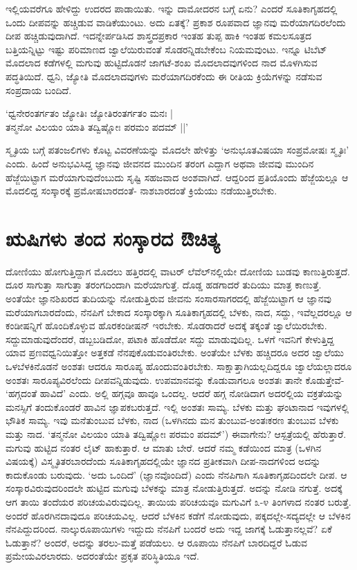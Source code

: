 ಇಲ್ಲಿಯವರೆಗೂ ಹೇಳಿದ್ದು ಉದರದ ಪಾಡಾಯಿತು. ಇನ್ನು ದಾಮೋದರನ ಬಗ್ಗೆ ಏನು? ಎಂದರೆ ಸೂತಿಕಾಗೃಹದಲ್ಲಿ ಒಂದು ದೀಪವನ್ನು ಹಚ್ಚಿಡುವ ವಾಡಿಕೆಯುಂಟು. ಅದು ಏತಕ್ಕೆ? ಪ್ರಕಾಶ ರೂಪವಾದ ಜ್ಞಾನವು ಮರೆಯಾಗದಿರಲೆಂದು ದೀಪ ಹಚ್ಚಿಡುವುದಾಗಿದೆ. ಇದನ್ನೇರ್ಪಡಿಸಿದ ಶಾಸ್ತ್ರದಪ್ರಕಾರ ಇಂತಹ ತುಪ್ಪ ಹಾಕಿ ಇಂತಹ ಕಮಲಸೂತ್ರದ ಬತ್ತಿಯನ್ನಿಟ್ಟು ಇಷ್ಟು ಪರಿಮಾಣದ ಜ್ವಾಲೆಯಿರುವಂತೆ ಸೊಡರನ್ನಿಡಬೇಕೆಂಬ ನಿಯಮವುಂಟು. ಇನ್ನೂ ಟಿಬೆಟ್ ಮೊದಲಾದ ಕಡೆಗಳಲ್ಲಿ ಮಗುವು ಹುಟ್ಟಿದೊಡನೆ ಜಾಗಟೆ-ಶಂಖ ಮೊದಲಾದವುಗಳಿಂದ ನಾದ ಮೊಳಗಿಸುವ ಪದ್ಧತಿಯಿದೆ. ಧ್ವನಿ, ಜ್ಯೋತಿ ಮೊದಲಾದವುಗಳು ಮರೆಯಾಗದಿರಕೆಂದು ಈ ರೀತಿಯ ಕ್ರಿಯೆಗಳನ್ನು ನಡೆಸುವ ಸಂಪ್ರದಾಯ ಬಂದಿದೆ.

\begin{shloka}
`ಧ್ವನೇರಂತರ್ಗತಂ ಜ್ಯೋತಿಃ ಜ್ಯೋತಿರಂತರ್ಗತಂ ಮನಃ |\\
ತನ್ಮನೋ ವಿಲಯಂ ಯಾತಿ ತದ್ವಿಷ್ಣೋಃ ಪರಮಂ ಪದಮ್ ||'
\end{shloka}

ಸ್ಮೃತಿಯ ಬಗ್ಗೆ ಪತಂಜಲಿಗಳು ಕೊಟ್ಟ ವಿವರಣೆಯನ್ನು ಮೊದಲೇ ಹೇಳಿತ್ತು `ಅನುಭೂತವಿಷಯಾ ಸಂಪ್ರಮೋಷಃ ಸ್ಮೃತಿಃ' ಎಂದು. ಹಿಂದೆ ಅನುಭವಿಸಿದ್ದ ಜ್ಞಾನವು ಜೀವನದ ಮುಂದಿನ ತರಂಗ ಎದ್ದಾಗ ಅಥವಾ ಜೀವವು ಮುಂದಿನ ಹೆಜ್ಜೆಯಿಟ್ಟಾಗ ಮರೆಯಾಗುವುದೆಂಬುದು ಸೃಷ್ಟಿ ಸಹಜವಾದ ಅಂಶವಾಗಿದೆ. ಆದ್ದರಿಂದ ಪ್ರತಿಯೊಂದು ಹೆಜ್ಜೆಯಲ್ಲೂ ಆ ಮೊದಲಿದ್ದ ಸಂಸ್ಕಾರಕ್ಕೆ  ಪ್ರಮೋಷಬಾರದಂತೆ- ನಾಶಬಾರದಂತೆ ಕ್ರಿಯೆಯು ನಡೆಯುತ್ತಿರಬೇಕು.

\section*{ಋಷಿಗಳು ತಂದ ಸಂಸ್ಕಾರದ ಔಚಿತ್ಯ}

ದೋಣಿಯು ಹೋಗುತ್ತಿದ್ದಾಗ ಮೊದಲು ಹತ್ತಿರದಲ್ಲಿ ವಾಟರ್ ಲೆವೆಲ್‌ನಲ್ಲಿಯೇ ದೋಣಿಯ ಬುಡವು ಕಾಣುತ್ತಿರುತ್ತದೆ. ದೂರ ಸಾಗುತ್ತಾ ಸಾಗುತ್ತಾ ತರಂಗದಿಂದಾಗಿ ಮರೆಯಾಗುತ್ತೆ. ದೊಡ್ಡ ಹಡಗಾದರೆ ತುದಿಯು ಮಾತ್ರ ಕಾಣುತ್ತೆ. ಅಂತೆಯೇ ಜ್ಞಾನಶಿಖರದ ತುದಿಯನ್ನು ನೋಡುತ್ತಿರುವ ಜೀವನು ಸಂಸಾರಸಾಗರದಲ್ಲಿ ಹೆಜ್ಜೆಯಿಟ್ಟಾಗ ಆ ಜ್ಞಾನವು ಮರೆಯಾಗಬಾರದೆಂದು, ನೆನಪಿಗೆ ಬೇಕಾದ ಸಂಸ್ಕಾರಕ್ಕಾಗಿ ಸೂತಿಕಾಗೃಹದಲ್ಲಿ ಬೆಳಕು, ನಾದ, ಸದ್ದು, ಇವೆಲ್ಲದರಲ್ಲೂ ಆ ಕಂಡೀಷನ್ನಿಗೆ ಹೊಂದಿಕೊಳ್ಳುವ ಹೊರಕಂಡೀಷನ್ ಇರಬೇಕು. ಸೊಡರಾದರೆ ಅದಕ್ಕೆ ತಕ್ಕಂತೆ ಜ್ವಾಲೆಯಿರಬೇಕು. ಸದ್ದುಮಾಡುವುದೆಂದರೆ, ಡಬ್ಬಬಡಿದೋ, ಪಟಾಕಿ ಹೊಡೆದೋ ಸದ್ದು ಮಾಡುವುದಿಲ್ಲ. ಒಳಗೆ ಇವನಿಗೆ ಕೇಳುತ್ತಿದ್ದ ಯಾವ ಪ್ರಣವಧ್ವನಿಯಿತ್ತೋ ಅತ್ತಕಡೆ ನೆನಪುಕೊಡುವಂತಿರಬೇಕು. ಅಂತೆಯೇ ಬೆಳಕು ಹಚ್ಚಿದರೂ ಅದರ ಜ್ವಾಲೆಯು ಒಳಬೆಳಕಿನೊಡನೆ ಅಂಶತಃ ಆದರೂ ಸಾರೂಪ್ಯ ಹೊಂದುವಂತಿರಬೇಕು. ಸಾಕ್ಷಾತ್ತಾಗಿಯಲ್ಲದಿದ್ದರೂ ಜ್ವಾಲೆಯಲ್ಲಾದರೂ ಅಂಶತಃ ಸಾರೂಪ್ಯವಿರಲೆಂದು ದೀಪವನ್ನಿಡುವುದು. ಉಪಮಾನವನ್ನು ಕೊಡುವಾಗಲೂ ಅಂಶತಃ ತಾನೇ ಕೊಡುತ್ತೇವೆ- `ಹಗ್ಗದಂತೆ ಹಾವಿದೆ' ಎಂದು. ಅಲ್ಲಿ ಹಗ್ಗವೂ ಹಾವೂ ಒಂದಲ್ಲ. ಆದರೆ ಹಗ್ಗ ನೋಡಿದಾಗ ಅದರಲ್ಲಿಯ ವಕ್ರತೆಯನ್ನು ಮನಸ್ಸಿಗೆ ತಂದುಕೊಂಡರೆ ಹಾವಿನ ಜ್ಞಾಪಕಬರುತ್ತದೆ. ಇಲ್ಲಿ ಅಂಶತಃ ಸಾಮ್ಯ. ಬೆಳಕು ಮತ್ತು ಘಂಟಾನಾದ ಇವುಗಳಲ್ಲಿ ಭೌತಿಕ ಸಾಮ್ಯ. ಇವು ಮನೆತುಂಬುವ ಬೆಳಕು, ನಾದ (ಒಳಗಿನದು ಮನ ತುಂಬುವ-ಅಂತಃಕರಣ ತುಂಬುವ ಬೆಳಕು ಮತ್ತು ನಾದ. `ತನ್ಮನೋ ವಿಲಯಂ ಯಾತಿ ತದ್ವಿಷ್ಣೋಃ ಪರಮಂ ಪದಮ್') ಈವಾಗೇನು? ಆಸ್ಪತ್ರೆಯಲ್ಲಿ ಹೆರುತ್ತಾರೆ. ಮಗುವು ಹುಟ್ಟಿದ ನಂತರ ಲೈಟ್ ಹಾಕುತ್ತಾರೆ. ಆ ಮಾತು ಬೇರೆ. ಆದರೆ ನಮ್ಮ ಕಡೆಯಿಂದ ಮಾತ್ರ (ಒಳಗಿನ ವಿಷಯಕ್ಕೆ) ವಿಸ್ಮೃತಿತರಬಾರದೆಂದು ಸೂತಿಕಾಗೃಹದಲ್ಲಿಯೇ ಜ್ಞಾನದ ಪ್ರತೀಕವಾಗಿ ದೀಪ-ನಾದಗಳಿಂದ ಅದನ್ನು ಕಾದುಕೊಂಡು ಬರುವುದು. `ಅದು ಒಂದಿದೆ' (ಜ್ಞಾನವೊಂದಿದೆ) ಎಂದು ನೆನಪಿಗಾಗಿ ಸೂತಿಕಾಗೃಹದಿಂದಲೇ ದೀಪ. ಆ ಸಂಸ್ಕಾರವಿರುವುದರಿಂದಲೇ ಹುಟ್ಟಿದ ಮಗುವು ಬೆಳಕನ್ನು ಮಾತ್ರ ನೋಡುತ್ತಿರುತ್ತದೆ. ಅದನ್ನು ನೋಡಿ ನಗುತ್ತೆ. ಅದಕ್ಕೆ ಆಗ ತಾಯಿ ತಂದೆಯರ ಪರಿಚಯವಿರುವುದಿಲ್ಲ. ತಾಯಿಯ ಪರಿಚಯವೂ ಮಗುವಿಗೆ ೩-೪ ತಿಂಗಳಾದ ನಂತರ ಬರುತ್ತೆ. ಅಂದರೆ ಹೊರಗಿನದಾವುದೂ ಪರಿಚಯವಿಲ್ಲ. ಆದರೆ ಬೆಳಕಿನ ಕಡೆಗೆ ನೋಡುವುದು, ಪಕ್ಕದಲ್ಲೇ-ಸದ್ಯದಲ್ಲೇ ಆ ಬೆಳಕಿನ ನೆನಪಿದ್ದುದರಿಂದ. ನಾಲ್ಕುರೂಪಾಯಿಗಳು ಇದ್ದುದು ನೆನಪಿಗೆ ಬಂದರೆ ಅದು ಇದ್ದ ಜಾಗಕ್ಕೆ ಓಡುತ್ತಾನಲ್ಲವೆ? ಏಕೆ ಓಡುತ್ತಾನೆ? ಅಂದರೆ, ಅದನ್ನು ತರಲು-ಮತ್ತೆ ಪಡೆಯಲು. ಆ ರೂಪಾಯಿ ನೆನಪಿಗೆ ಬಾರದಿದ್ದರೆ ಓಡುವ ಪ್ರಮೇಯವಿರಲಾರದು. ಅದರಂತೆಯೇ ಪ್ರಕೃತ ಪರಿಸ್ಥಿತಿಯೂ ಇದೆ.

